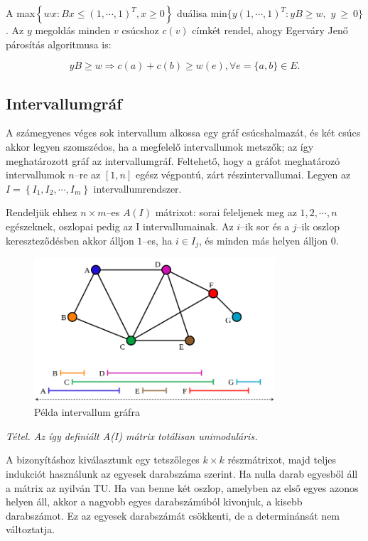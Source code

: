 A max$\left\{ wx : Bx \leq (1,\cdots,1)^T, x \geq 0 \right\}$ duálisa
min$\{ y(1,\cdots,1)^T : yB \geq w,$ $y~\geq~0\}$. Az $y$ megoldás
minden $v$ csúcshoz $c(v)$ címkét rendel, ahogy Egerváry Jenő párosítás
algoritmusa is:

\[ yB \geq w \Rightarrow c(a) + c(b) \geq w(e), \forall e=\{a,b\}\in E.\]

\subsection{Intervallumgráf}

A számegyenes véges sok intervallum alkossa egy gráf csúcshalmazát, és két csúcs
akkor legyen szomszédos, ha a megfelelő intervallumok metszők; az így
meghatározott gráf az intervallumgráf. Feltehető, hogy a gráfot meghatározó
intervallumok $n$--re az $[1,n]$ egész végpontú, zárt részintervallumai.
Legyen az $I=\left\{I_1, I_2, \cdots, I_m\right\}$ intervallumrendszer.

Rendeljük ehhez $n \times m$--es $A(I)$ mátrixot: sorai feleljenek meg az
$1,2,\cdots,n$ egészeknek, oszlopai pedig az I intervallumainak. Az $i$--ik sor
és a $j$--ik oszlop kereszteződésben akkor álljon $1$--es, ha $i \in I_j$, és
minden más helyen álljon $0$.

\begin{figure}[htbp]
\centering
\includegraphics[width=0.8\textwidth]{./kepek/intervalum_graf.png}
\caption{Példa intervallum gráfra} \label{fig:int_graf}
\end{figure}

\emph{Tétel. Az így definiált A(I) mátrix totálisan unimoduláris.}
\vspace{0.4cm}

A bizonyításhoz kiválasztunk egy tetszőleges $k \times k$ részmátrixot, majd
teljes indukciót használunk az egyesek darabszáma szerint. Ha nulla darab
egyesből áll a mátrix az nyilván TU. Ha van benne két oszlop, amelyben az első
egyes azonos helyen áll, akkor a nagyobb egyes darabszámúból kivonjuk, a kisebb
darabszámot. Ez az egyesek darabszámát csökkenti, de a determinánsát nem
változtatja.

